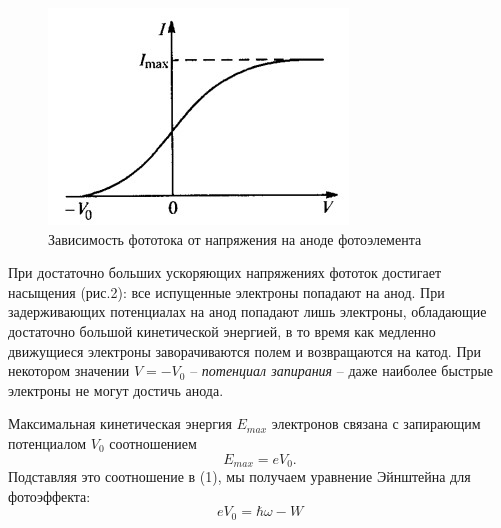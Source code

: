 \documentclass[a4paper,12pt]{article}
\begin{document}
    \begin{figure}[h!]
        \begin{center}
            \includegraphics[width=0.5\linewidth]{2020-12-09-2.jpg}
            \caption{Зависимость фототока от напряжения на аноде фотоэлемента}
        \end{center}
    \end{figure}
    \pagebreak
    При достаточно больших ускоряющих напряжениях фототок
    достигает насыщения (рис.2): все испущенные электроны попадают на анод. При
    задерживающих потенциалах на анод попадают лишь электроны, обладающие
    достаточно большой кинетической энергией, в то время как медленно движущиеся
    электроны заворачиваются полем и возвращаются на катод. При некотором значении
    $V=-V_0$ -- \textit{потенциал запирания} -- даже наиболее быстрые электроны
    не могут достичь анода.

    Максимальная кинетическая энергия $E_{max}$ электронов связана с запирающим
    потенциалом $V_0$ соотношением
    \begin{equation}
        E_{max}=eV_0.
    \end{equation}
    Подставляя это соотношение в (1), мы получаем уравнение Эйнштейна для фотоэффекта:
    \begin{equation}
        eV_0=\hbar\omega-W
    \end{equation}
\end{document}
